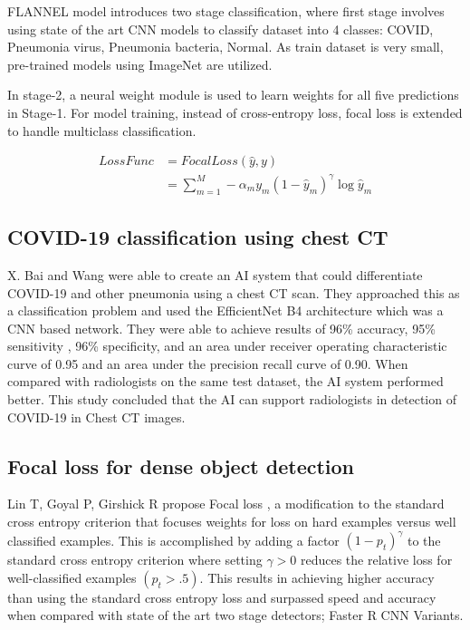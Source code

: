 \documentclass{sigkddExp}
\begin{document}
FLANNEL model introduces two stage classification, where first stage involves
using state of the art CNN models to classify dataset into 4 classes: COVID,
Pneumonia virus, Pneumonia bacteria, Normal. As train dataset is very small,
pre-trained models using ImageNet are utilized.

In stage-2, a neural weight module is used to learn weights for all five
predictions in Stage-1. For model training, instead of cross-entropy loss, focal
loss is extended to handle multiclass classification.

\begin{align}
    LossFunc & =FocalLoss(\hat{y},y)                                               \\
             & =\sum_{m=1}^{M} - \alpha_m y_m (1-\hat{y}_m)^\gamma \log{\hat{y}_m}
\end{align}

\subsection{COVID-19 classification using chest CT}

X. Bai and Wang \cite{pmid32339081} were able to create an AI system that could
differentiate COVID-19 and other pneumonia using a chest CT scan. They
approached this as a classification problem and used the EfficientNet B4
architecture which was a CNN based network. They were able to achieve results of
96\% accuracy, 95\% sensitivity , 96\% specificity, and an area under receiver
operating characteristic curve of 0.95 and an area under the precision recall
curve of 0.90. When compared with radiologists on the same test dataset, the AI
system performed better. This study concluded that the AI can support
radiologists in detection of COVID-19 in Chest CT images.

\subsection{Focal loss for dense object detection}

Lin T, Goyal P, Girshick R propose Focal loss \cite{lin2018focal}, a
modification to the standard cross entropy criterion that focuses weights for
loss on hard examples versus well classified examples. This is accomplished by
adding a factor $(1 - p_t)^\gamma$ to the standard cross entropy criterion where
setting $\gamma  > 0$ reduces the relative loss for well-classified examples
$(p_t > .5)$. This results in achieving higher accuracy than using the standard
cross entropy loss and surpassed speed and accuracy when compared with state of
the art two stage detectors; Faster R CNN Variants.
\end{document}
